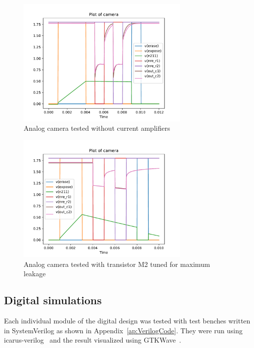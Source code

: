 \begin{figure}[H]
  \centering
  \includegraphics[width=0.75\textwidth]{../analog/camera4003nocurrentamp}
  \caption{Analog camera tested without current amplifiers}
  \label{fig:analog4003nocurrent}
\end{figure}

\begin{figure}[H]
  \centering
  \includegraphics[width=0.75\textwidth]{../analog/cameraLeakingM2}
  \caption{Analog camera tested with transistor M2 tuned for maximum leakage}
  \label{fig:analogLeakingM2}
\end{figure}



\newpage
\subsection{Digital simulations}

Each individual module of the digital design was tested with test benches written in SystemVerilog as shown in Appendix~\ref{ap:VerilogCode}.
They were run using icarus-verilog~\cite{icarusVL} and the result visualized using GTKWave~\cite{gtkwave}.

